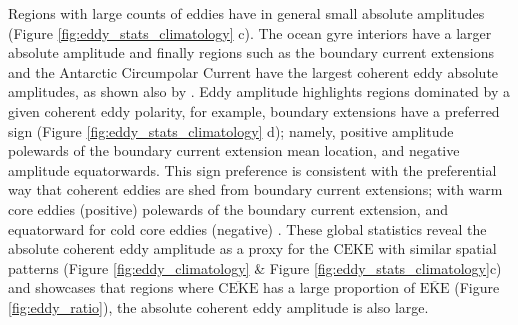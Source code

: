 \documentclass[draft,linenumbers]{agujournal2019}
\newcommand{\MEKE}{\overline{\textrm{EKE}}}
\newcommand{\MCEKE}{\overline{\textrm{CEKE}}}
\newcommand{\CEKE}{\textrm{CEKE}}
\begin{document}
	Regions with large counts of eddies have in general small absolute amplitudes (Figure \ref{fig:eddy_stats_climatology} c).
	The ocean gyre interiors have a larger absolute amplitude and finally regions such as the boundary current extensions and the Antarctic Circumpolar Current have the largest coherent eddy absolute amplitudes, as shown also by \citet{Chelton_The_2011}.
	Eddy amplitude highlights regions dominated by a given coherent eddy polarity, for example, boundary extensions have a preferred sign (Figure \ref{fig:eddy_stats_climatology} d); namely, positive amplitude polewards of the boundary current extension mean location, and negative amplitude equatorwards. 
	This sign preference is consistent with the preferential way that coherent eddies are shed from boundary current extensions; with warm core eddies (positive)  polewards of the boundary current extension, and equatorward for cold core eddies (negative) \citep{Kang_eddy_characteristics_2013,Chelton_The_2011,Chelton_Global_2007}. 
	These global statistics reveal the absolute coherent eddy amplitude as a proxy for the $\CEKE$ with similar spatial patterns (Figure \ref{fig:eddy_climatology} \& Figure \ref{fig:eddy_stats_climatology}c) and showcases that regions where $\MCEKE$ has a large proportion of $\MEKE$ (Figure \ref{fig:eddy_ratio}), the absolute coherent eddy amplitude is also large.


\end{document}
